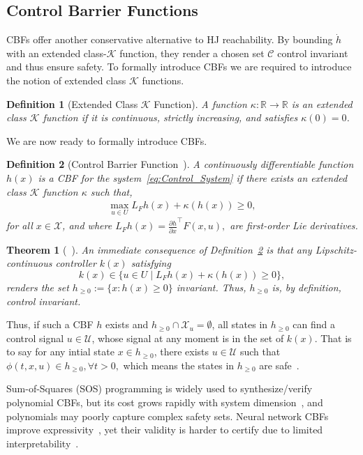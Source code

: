 \documentclass[letterpaper, 10 pt, conference]{ieeeconf}
\newtheorem{definition}{Definition}
\newtheorem{theorem}{Theorem}
\newcommand{\K}{\mathcal{K}}
\newcommand{\U}{\mathcal{U}}
\begin{document}
\subsection{Control Barrier Functions}\label{sec:CBF}
CBFs offer another conservative alternative to HJ reachability. By bounding $\dot h$ with an extended class-$\mathcal K$ function, they render a chosen set $\mathcal C$ control invariant and thus ensure safety. To formally introduce CBFs we are required to introduce the notion of extended class $\K$ functions. 

\begin{definition}[Extended Class $\K$ Function]
A function $\kappa: \mathbb{R} \to \mathbb{R}$ is an extended class $\K$ function if it is continuous, strictly increasing, and satisfies $\kappa(0) = 0$.
\end{definition}

We are now ready to formally introduce CBFs. 

\begin{definition}[Control Barrier Function~\cite{acenst2019ecc}]\label{def:CBF}
A continuously differentiable function $h(x)$ is a CBF for the system~\eqref{eq:Control_System} if there exists an extended class $\K$ function $\kappa$ such that,
\begin{align}\label{eq:CBF}
    \max_{u \in U} L_{F} h(x) +\kappa(h(x)) \ge 0,
\end{align}
for all $x \in \mathcal{X}$, and where $L_{F} h(x) = \frac{\partial h}{\partial x}^\top F(x,u),$ are first-order Lie derivatives.
\end{definition}

\begin{theorem}[~\cite{acenst2019ecc}]
An immediate consequence of Definition~\ref{def:CBF} is that any Lipschitz-continuous controller $k(x)$ satisfying $$k(x) \in \{ u\in U \mid L_{F}h(x) + \kappa(h(x)) \ge 0 \},$$ renders the set $h_{\ge 0}:=\{x:h(x)\ge0\}$ invariant. Thus, $h_{\ge0}$ is, by definition, control invariant.
\end{theorem}

Thus, if such a CBF $h$ exists and $h_{\ge 0} \cap \mathcal{X}_u = \emptyset$, all states in $h_{\ge 0}$ can find a control signal $u \in \U$, whose signal at any moment is in the set of $k(x)$. That is to say for any intial state $x \in h_{\ge 0}$, there exists $u \in \mathcal{U}$ such that $\phi(t,x,u) \in h_{\ge 0}, \forall t >0,$ which means the states in $h_{\ge 0}$ are safe~\cite{acenst2019ecc}.

Sum-of-Squares (SOS) programming is widely used to synthesize/verify polynomial CBFs, but its cost grows rapidly with system dimension~\cite{c2024tac,pj2004whscc}, and polynomials may poorly capture complex safety sets. Neural network CBFs improve expressivity~\cite{xwhcalr2023tro,lld2023corl,ssmgrrf2024icra}, yet their validity is harder to certify due to limited interpretability~\cite{ssmgrrf2024icra}.
\end{document}
